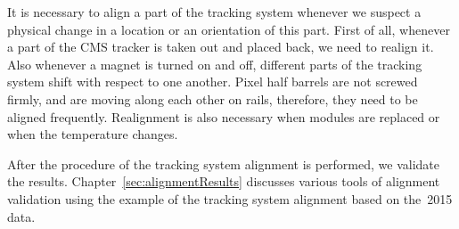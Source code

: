 It is necessary to align a part of the tracking system whenever we suspect a physical change in a location or an orientation of this part. First of all, whenever a part of the CMS tracker is taken out and placed back, we need to realign it. Also whenever a magnet is turned on and off, different parts of the tracking system shift with respect to one another. Pixel half barrels are not screwed firmly, and are moving along each other on rails, therefore, they need to be aligned frequently. Realignment is also necessary when modules are replaced or when the temperature changes. %

After the procedure of the tracking system alignment is performed, we validate the results. Chapter~\ref{sec:alignmentResults} discusses various tools of alignment validation using the example of the tracking system alignment based on the~2015 data.   


